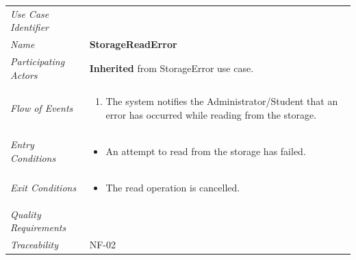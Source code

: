 \documentclass[12pt,letterpaper]{article}
\begin{document}
\begin{center}
	\begin{tabu} to 
		\toprule
		Use Case Identifier & \storagereaderror{} \\
		Name & {\bf StorageReadError} \\
		Participating Actors & \textbf{Inherited} from StorageError use case. \\
		Flow of Events & 
		\begin{minipage}[t]{\linewidth}
		    \begin{enumerate}
			    \item The system notifies the Administrator/Student that an error has occurred while reading from the storage.
			\end{enumerate}
		\end{minipage} \\

		Entry Conditions &
		\begin{minipage}[t]{\linewidth}
			\begin{itemize}
			    \item An attempt to read from the storage has failed.
	        \end{itemize}
		\end{minipage} \\

		Exit Conditions &
		\begin{minipage}[t]{\linewidth}
			\begin{itemize}
			    \item The read operation is cancelled.
	        \end{itemize}
		\end{minipage} \\

		Quality Requirements & \\

		Traceability & NF-02 \\
		\toprule
	\end{tabu}
\end{center}
\end{document}
